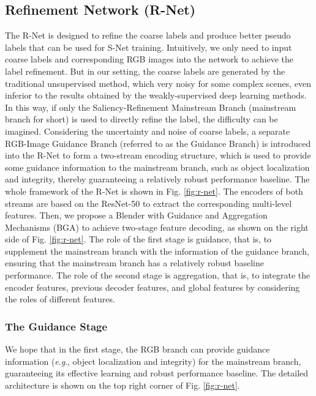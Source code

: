 \documentclass[journal]{IEEEtran}
\newcommand{\eg}{\textit{e}.\textit{g}.}
\begin{document}
\subsection{Refinement Network (R-Net)}\label{R-Net}
The R-Net is designed to refine the coarse labels and produce better pseudo labels that can be used for S-Net training. Intuitively, we only need to input coarse labels and corresponding RGB images into the network to achieve the label refinement. But in our setting, the coarse labels are generated by the traditional unsupervised method, which very noisy for some complex scenes, even inferior to the results obtained by the weakly-supervised deep learning methods. In this way, if only the Saliency-Refinement Mainstream Branch (mainstream branch for short) is used to directly refine the label, the difficulty can be imagined. Considering the uncertainty and noise of coarse labels, a separate RGB-Image Guidance Branch (referred to as the Guidance Branch) is introduced into the R-Net to form a two-stream encoding structure, which is used to provide some guidance information to the mainstream branch, such as object localization and integrity, thereby guaranteeing a relatively robust performance baseline.
The whole framework of the R-Net is shown in Fig. \ref{fig:r-net}.
The encoders of both streams are based on the ResNet-50 \cite{he2016deep} to extract the corresponding multi-level features. Then, we propose a Blender with Guidance and Aggregation Mechanisms (BGA) to achieve two-stage feature decoding, as shown on the right side of Fig. \ref{fig:r-net}.
The role of the first stage is guidance, that is, to supplement the mainstream branch with the information of the guidance branch, ensuring that the mainstream branch has a relatively robust baseline performance.
The role of the second stage is aggregation, that is, to integrate the encoder features, previous decoder features, and global features by considering the roles of different features.







\subsubsection{The Guidance Stage}
We hope that in the first stage, the RGB branch can provide guidance information (\eg, object localization and integrity) for the mainstream branch, guaranteeing its effective learning and robust performance baseline. The detailed architecture is shown on the top right corner of Fig. \ref{fig:r-net}.
\end{document}
